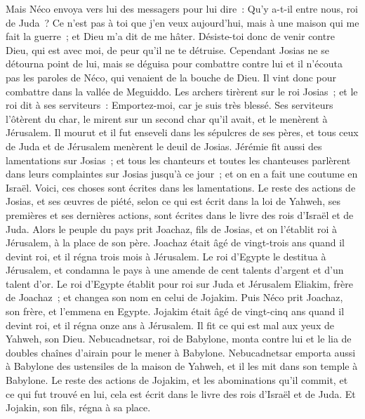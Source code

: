 \begin{multicols}{2}
Mais Néco envoya vers lui des messagers pour lui dire~: Qu'y a-t-il entre nous, roi de Juda~? Ce n'est pas à toi que j'en veux aujourd'hui, mais à une maison qui me fait la guerre~; et Dieu m'a dit de me hâter. Désiste-toi donc de venir contre Dieu, qui est avec moi, de peur qu'il ne te détruise.
Cependant Josias ne se détourna point de lui, mais se déguisa pour combattre contre lui et il n'écouta pas les paroles de Néco, qui venaient de la bouche de Dieu. Il vint donc pour combattre dans la vallée de Meguiddo.
Les archers tirèrent sur le roi Josias~; et le roi dit à ses serviteurs~: Emportez-moi, car je suis très blessé.
Ses serviteurs l'ôtèrent du char, le mirent sur un second char qu'il avait, et le menèrent à Jérusalem. Il mourut et il fut enseveli dans les sépulcres de ses pères, et tous ceux de Juda et de Jérusalem menèrent le deuil de Josias.
Jérémie fit aussi des lamentations sur Josias~; et tous les chanteurs et toutes les chanteuses parlèrent dans leurs complaintes sur Josias jusqu'à ce jour~; et on en a fait une coutume en Israël. Voici, ces choses sont écrites dans les lamentations.
Le reste des actions de Josias, et ses œuvres de piété, selon ce qui est écrit dans la loi de Yahweh,
ses premières et ses dernières actions, sont écrites dans le livre des rois d'Israël et de Juda.
\VerseOne{}Alors le peuple du pays prit Joachaz, fils de Josias, et on l'établit roi à Jérusalem, à la place de son père.
Joachaz était âgé de vingt-trois ans quand il devint roi, et il régna trois mois à Jérusalem.
Le roi d'Egypte le destitua à Jérusalem, et condamna le pays à une amende de cent talents d'argent et d'un talent d'or.
Le roi d'Egypte établit pour roi sur Juda et Jérusalem Eliakim, frère de Joachaz~; et changea son nom en celui de Jojakim. Puis Néco prit Joachaz, son frère, et l'emmena en Egypte.
Jojakim était âgé de vingt-cinq ans quand il devint roi, et il régna onze ans à Jérusalem. Il fit ce qui est mal aux yeux de Yahweh, son Dieu.
Nebucadnetsar, roi de Babylone, monta contre lui et le lia de doubles chaînes d'airain pour le mener à Babylone.
Nebucadnetsar emporta aussi à Babylone des ustensiles de la maison de Yahweh, et il les mit dans son temple à Babylone.
Le reste des actions de Jojakim, et les abominations qu'il commit, et ce qui fut trouvé en lui, cela est écrit dans le livre des rois d'Israël et de Juda. Et Jojakin, son fils, régna à sa place.

\end{multicols}
